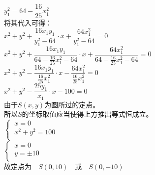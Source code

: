 \documentclass[UTF8]{ctexart}
\begin{document}
\begin{multicols}{2}
        $y_1^2=64-\dfrac{16}{25}x_1^2$\\[10mm]
        将其代入可得：\\[5mm]
        $x^2+y^2+\dfrac{16x_1y_1}{y_1^2-64}\cdot x+\dfrac{64x_1^2}{y_1^2-64}=0$\\[5mm]
        $x^2+y^2+\dfrac{16x_1y_1}{64-\frac{16}{25}x_1^2-64}\cdot x+\dfrac{64x_1^2}{64-\frac{16}{25}x_1^2-64}=0$\\[5mm]
        $x^2+y^2-\dfrac{16x_1y_1}{\frac{16}{25}x_1^2}\cdot x-\dfrac{64x_1^2}{\frac{16}{25}x_1^2}=0$\\[5mm]
        $x^2+y^2-\dfrac{25y_1}{x_1}\cdot x-100=0$\\[10mm]
        由于$S(x,y)$为圆所过的定点。\\[3mm]
        所以$S$的坐标取值应当使得上方推出等式恒成立。\\[5mm]
        \begin{math}
            \begin{cases}
                ~x=0\\[1mm]
                ~x^2+y^2=100\\[1mm]
            \end{cases}
        \end{math}\\[5mm]
        \begin{math}
            \begin{cases}
                ~x=0\\[1mm]
                ~y=\pm 10\\[1mm]
            \end{cases}
        \end{math}\\[5mm]
        故定点为~~$S(0,10)$~~或~~$S(0,-10)$
        \newpage
    \end{multicols}

\newpage
\end{document}
